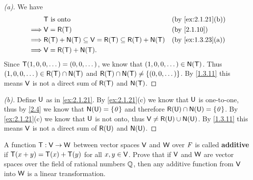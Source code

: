 \begin{proof}[(a)]
  We have
  \begin{align*}
             & \T \text{ is onto}                                                   &  & \text{(by \cref{ex:2.1.21}(b))} \\
    \implies & \V = \rg{\T}                                                         &  & \text{(by \cref{2.1.10})}       \\
    \implies & \rg{\T} + \ns{\T} \subseteq \V = \rg{\T} \subseteq \rg{\T} + \ns{\T} &  & \text{(by \cref{ex:1.3.23}(a))} \\
    \implies & \V = \rg{\T} + \ns{\T}.
  \end{align*}
  Since \(\mathsf{T}(1, 0, 0, \dots) = (0, 0, \dots)\), we know that \((1, 0, 0, \dots) \in \ns{\T}\).
  Thus \((1, 0, 0, \dots) \in \rg{\T} \cap \ns{\T}\) and \(\rg{\T} \cap \ns{\T} \neq \set{(0, 0, \dots)}\).
  By \cref{1.3.11} this means \(\mathsf{V}\) is not a direct sum of \(\rg{\T}\) and \(\ns{\T}\).
\end{proof}

\begin{proof}[(b)]
  Define \(\mathsf{U}\) as in \cref{ex:2.1.21}.
  By \cref{ex:2.1.21}(c) we know that \(\mathsf{U}\) is one-to-one, thus by \cref{2.4} we know that \(\ns{\U} = \set{\zv}\) and therefore \(\rg{\U} \cap \ns{\U} = \set{\zv}\).
  By \cref{ex:2.1.21}(c) we know that \(\mathsf{U}\) is not onto, thus \(\V \neq \rg{\U} \cup \ns{\U}\).
  By \cref{1.3.11} this means \(\mathsf{V}\) is not a direct sum of \(\rg{\U}\) and \(\ns{\U}\).
\end{proof}

\begin{ex}\label{ex:2.1.37}
  A function \(\mathsf{T} : \mathsf{V} \to \mathsf{W}\) between vector spaces \(\mathsf{V}\) and \(\mathsf{W}\) over \(\mathit{F}\) is called \textbf{additive} if \(\mathsf{T}(x + y) = \mathsf{T}(x) + \mathsf{T}(y)\) for all \(x, y \in \mathsf{V}\).
  Prove that if \(\mathsf{V}\) and \(\mathsf{W}\) are vector spaces over the field of rational numbers \(\mathbb{Q}\), then any additive function from \(\mathsf{V}\) into \(\mathsf{W}\) is a linear transformation.
\end{ex}

